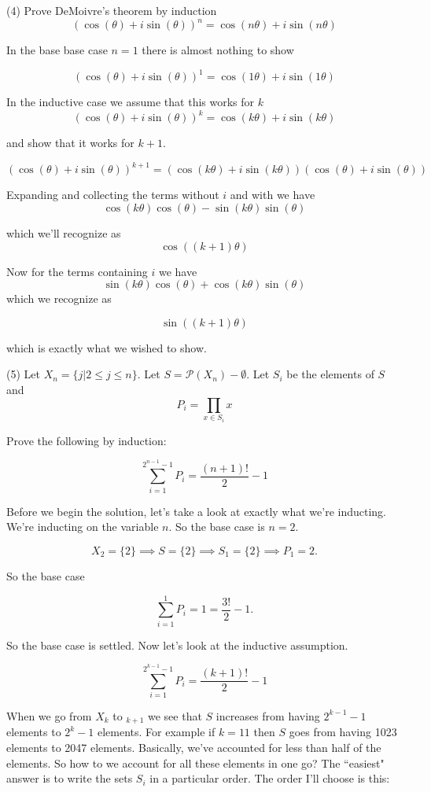 \documentclass{amsart}
\theoremstyle{definition}
\theoremstyle{remark}
\numberwithin{equation}{section}
\begin{document}
(4) Prove DeMoivre's theorem by induction
\[
(\cos(\theta)+ i \sin(\theta))^n = \cos(n\theta) + i \sin(n\theta)
\]

In the base base case $n=1$ there is almost nothing to show

\[
(\cos(\theta)+ i \sin(\theta))^1 = \cos(1\theta) + i \sin(1\theta)
\]


In the inductive case we assume that this works for $k$
\[
(\cos(\theta)+ i \sin(\theta))^k = \cos(k\theta) + i \sin(k\theta)
\]

and show that it works for $k+1$.

\[
(\cos(\theta)+ i \sin(\theta))^{k+1} = (\cos(k\theta) + i \sin(k\theta))(\cos(\theta)+i\sin(\theta))
\]

Expanding and collecting the terms without $i$ and with we have
\[
\cos(k\theta) \cos(\theta) - \sin(k\theta)\sin(\theta)
\]

which we'll recognize as 
\[
\cos((k+1)\theta)
\]


Now for the terms containing $i$ we have
\[
\sin(k\theta)\cos(\theta) + \cos(k\theta)\sin(\theta)
\] 
which we recognize as

\[
\sin((k+1)\theta)
\]


which is exactly what we wished to show.

\vspace{1in}

(5) Let $X_n = \{j| 2\le j \le n\}$.
Let $S = \mathcal{P}(X_n)-\emptyset$.  Let $S_i$ be the elements of $S$ and 
\[
P_i = \prod_{x\in S_i} x
\]

Prove the following by induction:

\[
\sum_{i=1}^{2^{n-1}-1} P_i = \frac{(n+1)!}{2} -1
\]

Before we begin the solution, let's take a look at exactly what we're inducting.  We're inducting on the variable $n$.  So the base case is $n=2$.

\[
X_2 = \{2\} \implies S = \{2\} \implies S_1 = \{2\} \implies P_1 =2.
\]

So the base case

\[
\sum_{i=1}^{1} P_i = 1 = \frac{3!}{2} - 1.
\]

So the base case is settled.  Now let's look at the inductive assumption.

\[
\sum_{i=1}^{2^{k-1}-1} P_i = \frac{(k+1)!}{2} -1
\]

When we go from $X_k$ to $_{k+1}$ we see that $S$ increases from having $2^{k-1}-1$ elements to $2^k-1$ elements.  For example if $k=11$ then $S$ goes from having 1023 elements to 2047 elements.  Basically, we've accounted for less than half of the elements.  So how to we account for all these elements in one go?  The ``easiest" answer is to write the sets $S_i$ in a particular order.  The order I'll choose is this:\\
\end{document}
